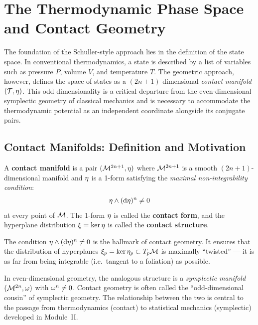 \chapter{The Thermodynamic Phase Space and Contact Geometry}

The foundation of the Schuller-style approach lies in the definition of the state space. In conventional thermodynamics, a state is described by a list of variables such as pressure $P$, volume $V$, and temperature $T$. The geometric approach, however, defines the space of states as a $(2n+1)$-dimensional \emph{contact manifold} $(\mathcal{T}, \eta)$. This odd dimensionality is a critical departure from the even-dimensional symplectic geometry of classical mechanics and is necessary to accommodate the thermodynamic potential as an independent coordinate alongside its conjugate pairs.

\section{Contact Manifolds: Definition and Motivation}

\begin{definition}
A \textbf{contact manifold} is a pair $(\mathcal{M}^{2n+1}, \eta)$ where $\mathcal{M}^{2n+1}$ is a smooth $(2n+1)$-dimensional manifold and $\eta$ is a 1-form satisfying the \emph{maximal non-integrability condition}:
\begin{equation}
\eta \wedge (\dd\eta)^n \neq 0
\end{equation}
at every point of $\mathcal{M}$. The 1-form $\eta$ is called the \textbf{contact form}, and the hyperplane distribution $\xi = \ker\eta$ is called the \textbf{contact structure}.
\end{definition}

The condition $\eta \wedge (\dd\eta)^n \neq 0$ is the hallmark of contact geometry. It ensures that the distribution of hyperplanes $\xi_p = \ker\eta_p \subset T_p\mathcal{M}$ is maximally ``twisted'' --- it is as far from being integrable (i.e.\ tangent to a foliation) as possible.

\begin{remark}
In even-dimensional geometry, the analogous structure is a \emph{symplectic manifold} $(\mathcal{M}^{2n}, \omega)$ with $\omega^n \neq 0$. Contact geometry is often called the ``odd-dimensional cousin'' of symplectic geometry. The relationship between the two is central to the passage from thermodynamics (contact) to statistical mechanics (symplectic) developed in Module~II.
\end{remark}


